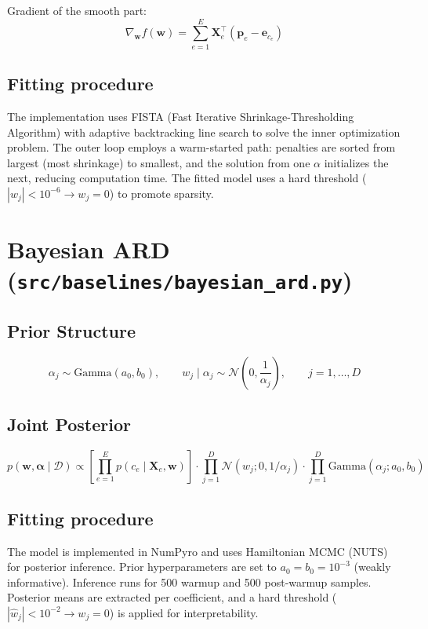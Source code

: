 \documentclass[11pt,a4paper]{article}
\begin{document}
Gradient of the smooth part:
\[
\nabla_{\mathbf{w}} f(\mathbf{w}) = \sum_{e=1}^{E} \mathbf{X}_e^\top (\mathbf{p}_e - \mathbf{e}_{c_e})
\]

\subsection{Fitting procedure}

The implementation uses FISTA (Fast Iterative Shrinkage-Thresholding Algorithm) with adaptive backtracking line search to solve the inner optimization problem.  The outer loop employs a warm-started path: penalties are sorted from largest (most shrinkage) to smallest, and the solution from one $\alpha$ initializes the next, reducing computation time.  The fitted model uses a hard threshold ($|w_j| < 10^{-6} \to w_j = 0$) to promote sparsity.


\section{Bayesian ARD (\texttt{src/baselines/bayesian\_ard.py})}
\label{sec:ard}

\subsection{Prior Structure}

\[
\alpha_j \sim \text{Gamma}(a_0, b_0), \qquad w_j \mid \alpha_j \sim \mathcal{N}\!\left(0, \frac{1}{\alpha_j}\right), \qquad j = 1, \ldots, D
\]

\subsection{Joint Posterior}

\[
p(\mathbf{w}, \boldsymbol{\alpha} \mid \mathcal{D}) \propto \left[\prod_{e=1}^{E} p(c_e \mid \mathbf{X}_e, \mathbf{w})\right] \cdot \prod_{j=1}^{D} \mathcal{N}(w_j; 0, 1/\alpha_j) \cdot \prod_{j=1}^{D} \text{Gamma}(\alpha_j; a_0, b_0)
\]

\subsection{Fitting procedure}

The model is implemented in NumPyro and uses Hamiltonian MCMC (NUTS) for posterior inference.  Prior hyperparameters are set to $a_0 = b_0 = 10^{-3}$ (weakly informative).  Inference runs for 500 warmup and 500 post-warmup samples.  Posterior means are extracted per coefficient, and a hard threshold ($|\hat{w}_j| < 10^{-2} \to w_j = 0$) is applied for interpretability.
\end{document}
